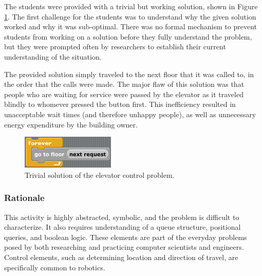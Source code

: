 	
	The students were provided with a trivial but working solution,
	shown in Figure \ref{fig:elevator-trivial}. The first challenge for the students was to understand why the given solution worked and why it was sub-optimal.
	There was no formal mechanism to prevent students from working
	on a solution before they fully understand the problem, but they were prompted often by researchers to establish their current understanding
	of the situation.
	
	The provided solution simply traveled to the next floor that it was
	called to, in the order that the calls were made. The major flaw of
	this solution was that people who are waiting for service were passed
	by the elevator as it traveled blindly to whomever pressed the button
	first. This inefficiency resulted in unacceptable wait times (and
	therefore unhappy people), as well as unnecessary energy expenditure
	by the building owner.
	
	\begin{figure}
	\begin{centering}
	\includegraphics{images/elevator-trivial-solution}
	\par\end{centering}
	
	\caption{\label{fig:elevator-trivial}Trivial solution of the elevator control
	problem.}
	
	
	
	\end{figure}
	
	
	
	\subsubsection{Rationale}
	
	This activity is highly abstracted, symbolic, and the problem is difficult
	to characterize. It also requires understanding of a queue structure,
	positional queries, and boolean logic. These elements are part of
	the everyday problems posed by both researching and practicing computer
	scientists and engineers. Control elements, such as determining location
	and direction of travel, are specifically common to robotics.




